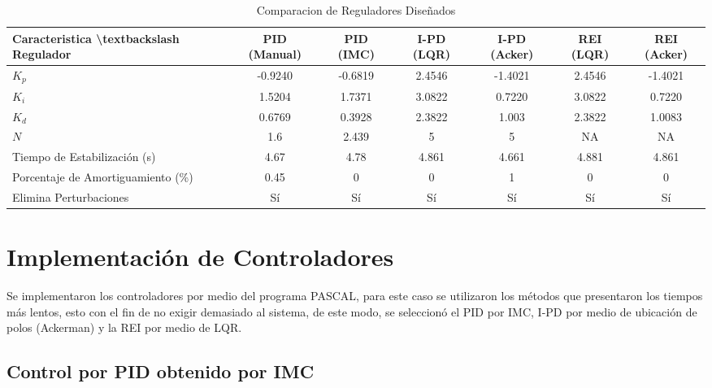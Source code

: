 \documentclass[conference,onecolumn,12pt]{IEEEtran}
\numberwithin{equation}{subsection}
\begin{document}
\begin{table}[htbp]
\centering
\caption{Comparacion de Reguladores Diseñados}
\label{tab:comp_design}
\begin{tabular}{|l|c|c|c|c|c|c|}
\hline
Caracteristica \textbackslash{}textbackslash Regulador & PID (Manual) & PID (IMC) & I-PD (LQR) & I-PD (Acker) & REI (LQR) & REI (Acker) \\ \hline
$K_p$                                                  &      -0.9240       & -0.6819          & 2.4546     & -1.4021      & 2.4546    & -1.4021     \\ \hline
$K_i$                                                  &    1.5204&  1.7371          & 3.0822     & 0.7220       & 3.0822    & 0.7220      \\ \hline
$K_d$                                                  &    0.6769          & 0.3928          & 2.3822     & 1.003        & 2.3822    & 1.0083      \\ \hline
$N$                                                    &     1.6         & 2.439          & 5          & 5            & NA        & NA          \\ \hline
Tiempo de Estabilización (s)                           & 4.67        &     4.78      & 4.861      & 4.661        & 4.881     & 4.861       \\ \hline
Porcentaje de Amortiguamiento (\%)                     & 0.45            &   0        & 0          & 1            & 0         & 0           \\ \hline
Elimina Perturbaciones                                 & Sí           & Sí        & Sí         & Sí           & Sí        & Sí          \\ \hline
\end{tabular}
\end{table}

\section{Implementación de Controladores}

Se implementaron los controladores por medio del programa PASCAL, para este caso se utilizaron los métodos que presentaron los tiempos más lentos, esto con el fin de no exigir demasiado al sistema, de este modo, se seleccionó el PID por IMC, I-PD por medio de ubicación de polos (Ackerman) y la REI por medio de LQR.



\subsection{Control por PID obtenido por IMC}
\end{document}
